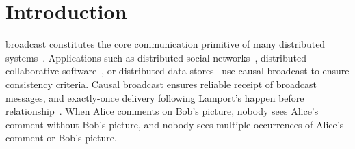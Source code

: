  
\section{Introduction}

 broadcast constitutes the core communication primitive
of many distributed systems~\cite{hadzilacos1994modular}. Applications such as
distributed social networks~\cite{borthakur2013petabyte}, distributed
collaborative software~\cite{heinrich2012exploiting,nedelec2016crate}, or
distributed data
stores~\cite{bailis2013bolton,bravo2017saturn,demers1987epidemic,lloyd2011cops,shapiro2011comprehensive}
use causal broadcast to ensure consistency criteria.  Causal broadcast ensures
reliable receipt of broadcast messages, and exactly-once delivery following
Lamport's happen before relationship~\cite{lamport1978time}. When Alice comments
on Bob's picture, nobody sees Alice's comment without Bob's picture, and nobody
sees multiple occurrences of Alice's comment or Bob's picture.


